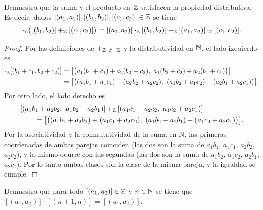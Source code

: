 \documentclass[12pt,a4paper]{article}
\begin{document}
    \begin{problema}
        Demuestra que la suma y el producto en $\mathbb{Z}$ satisfacen la propiedad distributiva. Es decir, dados
        $[(a_1,a_2)],[(b_1,b_2)],[(c_1,c_2)]\in\mathbb{Z}$ se tiene
        \begin{equation*}
            [(a_1,a_2)]\cdot_{\Z}\big([(b_1,b_2)]+_{\Z}[(c_1,c_2)]\big)
            =[(a_1,a_2)]\cdot_{\Z}[(b_1,b_2)]+_{\Z}[(a_1,a_2)]\cdot_{\Z}[(c_1,c_2)].
        \end{equation*}
    \end{problema}

    \begin{proof}
        Por las definiciones de $+_{\mathbb{Z}}$ y $\cdot_{\mathbb{Z}}$ y la distributividad en $\mathbb{N}$, el lado izquierdo es
        \begin{align*}
            [(a_1,a_2)]\cdot_{\Z}[(b_1+c_1,b_2+c_2)]
            &= \big[\big(a_1(b_1+c_1)+a_2(b_2+c_2),\ a_1(b_2+c_2)+a_2(b_1+c_1)\big)\big]\\
            &= \big[\big((a_1b_1+a_1c_1)+(a_2b_2+a_2c_2),\ (a_1b_2+a_1c_2)+(a_2b_1+a_2c_1)\big)\big].
        \end{align*}
        Por otro lado, el lado derecho es
        \begin{align*}
            &[(a_1b_1+a_2b_2,\ a_1b_2+a_2b_1)]+_{\Z}[(a_1c_1+a_2c_2,\ a_1c_2+a_2c_1)]\\
            &\qquad= \big[\big((a_1b_1+a_2b_2)+(a_1c_1+a_2c_2),\ (a_1b_2+a_2b_1)+(a_1c_2+a_2c_1)\big)\big].
        \end{align*}
        Por la asociatividad y la conmutatividad de la suma en $\mathbb{N}$, las primeras coordenadas de ambas parejas
        coinciden (las dos son la suma de $a_1b_1$, $a_1c_1$, $a_2b_2$, $a_2c_2$), y lo mismo ocurre con las segundas
        (las dos son la suma de $a_1b_2$, $a_1c_2$, $a_2b_1$, $a_2c_1$). Por lo tanto ambas clases son la clase de
        la misma pareja, y la igualdad se cumple.
    \end{proof}

    \begin{problema}
        Demuestra que para todo $[(a_1,a_2)]\in\mathbb{Z}$ y $n\in\mathbb{N}$ se tiene que
        $[(a_1,a_2)]\cdot[(n+1,n)]=[(a_1,a_2)]$.
    \end{problema}
\end{document}
